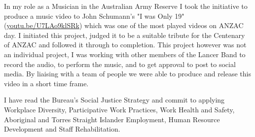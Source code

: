 
In my role as a Musician in the Australian Army Reserve I took the initiative to produce a music video to John Schumann's "I was Only 19" (\href{https://youtu.be/U7LAo9klSRk}{youtu.be/U7LAo9klSRk}) which was one of the most played videos on ANZAC day. I initiated this project, judged it to be a suitable tribute for the Centenary of ANZAC and followed it through to completion. This project however was not an individual project, I was working with other members of the Lancer Band to record the audio, to perform the music, and to get approval to post to social media. By liaising with a team of people we were able to produce and release this video in a short time frame.


I have read the Bureau's Social Justice Strategy and commit to applying Workplace Diversity, Participative Work Practices, Work Health and Safety, Aboriginal and Torres Straight Islander Employment, Human Resource Development and Staff Rehabilitation.

\makeletterclosing


